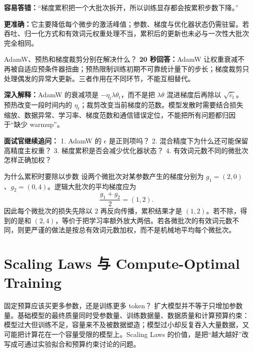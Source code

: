 \begin{wrongbox}
\textbf{容易答错：}“梯度累积把一个大批次拆开，所以训练显存都会按累积步数下降。”

\textbf{更准确：}它主要降低每个微步的激活峰值；参数、梯度与优化器状态仍需驻留。若吞吐、归一化方式和有效词元权重处理不当，累积后的更新也未必与一次性大批次完全相同。
\end{wrongbox}

\begin{interviewbox}{AdamW、预热和梯度裁剪分别在解决什么？}
\textbf{20 秒回答：}AdamW 让权重衰减不再被自适应预条件器扭曲；预热限制训练初期不可靠统计量下的步长；梯度裁剪只处理偶发的异常大更新。三者作用在不同环节，不能互相替代。

\textbf{深入解释：}AdamW 的衰减项是 $-\eta_t\lambda\theta_t$，而不是把 $\lambda\theta$ 混进梯度后再除以 $\sqrt{\hat v_t}$。预热改变一段时间内的 $\eta_t$；裁剪改变当前梯度的范数。模型发散时需要结合损失缩放、数据异常、学习率、梯度范数和通信错误定位，不能把所有问题都归因于“缺少 warmup”。

\textbf{面试官继续追问：}
1. AdamW 的 $\epsilon$ 是正则项吗？
2. 混合精度下为什么还可能保留高精度主权重？
3. 梯度累积是否会减少优化器状态？
4. 有效词元数不同的微批次怎样正确加权？
\end{interviewbox}

\begin{examplebox}{为什么累积时要除以步数}
设两个微批次对某参数产生的梯度分别为 $g_1=(2,0)$、$g_2=(0,4)$。逻辑大批次的平均梯度应为
\[
\frac{g_1+g_2}{2}=(1,2).
\]
因此每个微批次的损失先除以 $2$ 再反向传播，累积结果才是 $(1,2)$。若不除，得到的是和 $(2,4)$，等价于把学习率额外放大两倍。若各微批次的有效词元数不同，则更严谨的做法是按总有效词元数加权，而不是机械地平均每个微批次。
\end{examplebox}

\section{Scaling Laws 与 Compute-Optimal Training}
\label{sec:scaling-laws}

\begin{motivationbox}{固定预算应该买更多参数，还是训练更多 token？}
扩大模型并不等于只增加参数量。基础模型的最终质量同时受参数量、训练数据量、数据质量和计算预算约束：模型过大但训练不足，容量来不及被数据塑造；模型过小却反复吞入大量数据，又可能把计算花在一个容量受限的模型上。Scaling Laws 的价值，是把“越大越好”改写成可通过实验拟合和预算约束讨论的问题。
\end{motivationbox}

